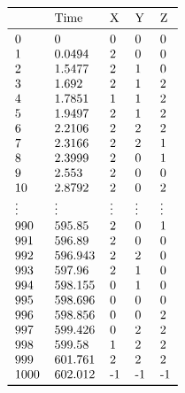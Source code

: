   \[
    \begin{tabular}{lllll}
      \toprule
      {} &     Time &   X &   Y &   Z \\
      \midrule
      0    &        0 &   0 &   0 &   0 \\
      1    &   0.0494 &   2 &   0 &   0 \\
      2    &   1.5477 &   2 &   1 &   0 \\
      3    &   1.692 &   2 &   1 &   2 \\
      4    &   1.7851 &   1 &   1 &   2 \\
      5    &   1.9497 &   2 &   1 &   2 \\
      6    &   2.2106 &   2 &   2 &   2 \\
      7    &   2.3166 &   2 &   2 &   1 \\
      8    &   2.3999 &   2 &   0 &   1 \\
      9    &   2.553 &   2 &   0 &   0 \\
      10   &   2.8792 &   2 &   0 &   2 \\  
      \vdots  &   \vdots    & \vdots & \vdots & \vdots \\
      990  &   595.85 &   2 &   0 &   1 \\
      991  &   596.89 &   2 &   0 &   0 \\
      992  &  596.943 &   2 &   2 &   0 \\
      993  &   597.96 &   2 &   1 &   0 \\
      994  &  598.155 &   0 &   1 &   0 \\
      995  &  598.696 &   0 &   0 &   0 \\
      996  &  598.856 &   0 &   0 &   2 \\
      997  &  599.426 &   0 &   2 &   2 \\
      998  &   599.58 &   1 &   2 &   2 \\
      999  &  601.761 &   2 &   2 &   2 \\
      1000 &  602.012 &  -1 &  -1 &  -1 \\
      \bottomrule
    \end{tabular}
  \]

